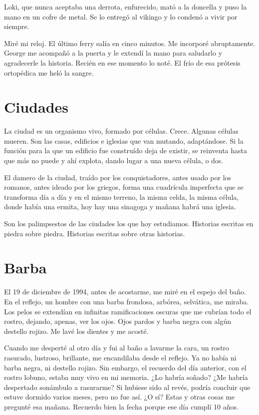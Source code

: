 \documentclass[11pt,twoside,openright,a6paper]{book}
\begin{document}
Loki, que nunca aceptaba una derrota, enfurecido, mató a la doncella y puso la mano en un cofre de metal. Se lo entregó al vikingo y lo condenó a vivir por siempre.

Miré mi reloj. El último ferry salía en cinco minutos. Me incorporé abruptamente. George me acompañó a la puerta y le extendí la mano para saludarlo y agradecerle la historia. Recién en ese momento lo noté. El frío de esa prótesis ortopédica me heló la sangre.

\chapter*{Ciudades}

La ciudad es un organismo vivo, formado por células. Crece. Algunas células mueren. Son las casas, edificios e iglesias que van mutando, adaptándose. Si la función para la que un edificio fue construído deja de existir, se reinventa hasta que más no puede y ahí explota, dando lugar a una nueva célula, o dos.

El damero de la ciudad, traído por los conquistadores, antes usado por los romanos, antes ideado por los griegos, forma una cuadrícula imperfecta que se transforma día a día y en el mismo terreno, la misma celda, la misma célula, donde había una ermita, hoy hay una sinagoga y mañana habrá una iglesia.

Son los palimpsestos de las ciudades los que hoy estudiamos. Historias escritas en piedra sobre piedra. Historias escritas sobre otras historias.


\chapter*{Barba}

El 19 de diciembre de 1994, antes de acostarme, me miré en el espejo del baño. En el reflejo, un hombre con una barba frondosa, arbórea, selvática, me miraba. Los pelos se extendían en infinitas ramificaciones oscuras que me cubrían todo el rostro, dejando, apenas, ver los ojos. Ojos pardos y barba negra con algún destello rojizo. Me lavé los dientes y me acosté.

Cuando me desperté al otro día y fui al baño a lavarme la cara, un rostro rasurado, lustroso, brillante, me encandilaba desde el reflejo. Ya no había ni barba negra, ni destello rojizo. Sin embargo, el recuerdo del día anterior, con el rostro lobuno, estaba muy vivo en mi memoria. ¿Lo habría soñado? ¿Me habría despertado sonámbulo a rasurarme? Si hubiese sido al revés, podría concluir que estuve dormido varios meses, pero no fue así. ¿O sí? Estas y otras cosas me pregunté esa mañana. Recuerdo bien la fecha porque ese día cumplí 10 años.
\end{document}
